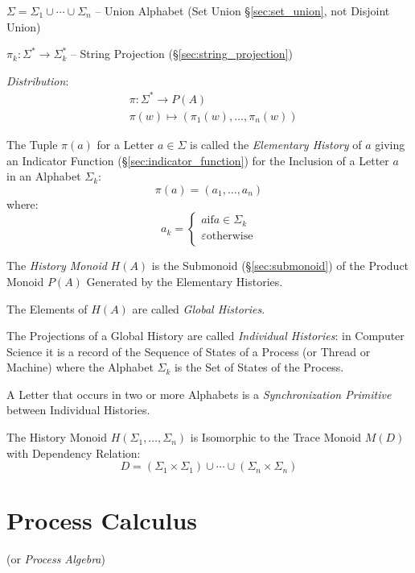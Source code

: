 $\Sigma = \Sigma_1 \cup \cdots \cup \Sigma_n$ -- Union Alphabet (Set
Union \S\ref{sec:set_union}, not Disjoint Union)

$\pi_k : \Sigma^* \rightarrow \Sigma_k^*$ -- String Projection
(\S\ref{sec:string_projection})

\emph{Distribution}:
\begin{align*}
  & \pi : \Sigma^* \rightarrow P(A) \\
  & \pi(w) \mapsto (\pi_1(w), \ldots, \pi_n(w))
\end{align*}

The Tuple $\pi(a)$ for a Letter $a \in \Sigma$ is called the
\emph{Elementary History} of $a$ giving an Indicator Function
(\S\ref{sec:indicator_function}) for the Inclusion of a Letter $a$ in
an Alphabet $\Sigma_k$:
\[
  \pi(a) = (a_1, \ldots, a_n)
\]
where:
\[
  a_k =
  \begin{cases}
    a \text{if} a \in \Sigma_k \\
    \varepsilon \text{otherwise} \\
  \end{cases}
\]

The \emph{History Monoid} $H(A)$ is the Submonoid
(\S\ref{sec:submonoid}) of the Product Monoid $P(A)$ Generated by the
Elementary Histories.

The Elements of $H(A)$ are called \emph{Global Histories}.

The Projections of a Global History are called \emph{Individual
  Histories}: in Computer Science it is a record of the Sequence of
States of a Process (or Thread or Machine) where the Alphabet
$\Sigma_k$ is the Set of States of the Process.

A Letter that occurs in two or more Alphabets is a
\emph{Synchronization Primitive} between Individual Histories.

The History Monoid $H(\Sigma_1, \ldots, \Sigma_n)$ is Isomorphic to
the Trace Monoid $M(D)$ with Dependency Relation:
\[
  D = (\Sigma_1 \times \Sigma_1) \cup \cdots
    \cup (\Sigma_n \times \Sigma_n)
\]



\section{Process Calculus}\label{sec:process_calculus}

(or \emph{Process Algebra})

